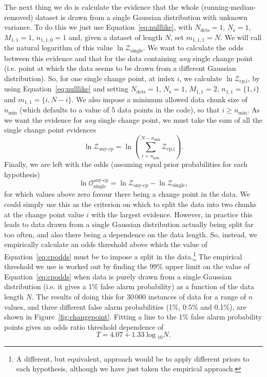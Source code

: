 The next thing we do is calculate the evidence that the whole (running-median-removed) dataset is drawn from a single
Gaussian distribution with unknown variance. To do this we just use Equation~\ref{eq:nulllike}, with $N_{\text{dets}} =1$,
$N_{\text{s}}=1$, $M_{1,1}=1$, $n_{1,1,0}=1$ and, given a dataset of length $N$, set $m_{1,1,1}=N$. We will call the natural logarithm
of this value $\ln{\mathcal{Z}_{\text{single}}}$. We want to calculate the odds between this evidence and that for the data containing
{\it any} single change point (i.e. point at which the data seems to be drawn from a different Gaussian distribution). So, for
one single change point, at index $i$, we calculate $\ln{\mathcal{Z}_{\text{cp,i}}}$, by using Equation~\ref{eq:nulllike} and setting
$N_{\text{dets}} =1$, $N_{\text{s}}=1$, $M_{1,1}=2$, $n_{1,1}=\{1,i\}$ and $m_{1,1} = \{i,N-i\}$. We also impose a minimum allowed data
chunk size of $n_{\text{min}}$ (which defaults to a value of 5 data points in the code), so that $i \geqslant n_{\text{min}}$. As we want
the evidence for {\it any} single change point, we must take the sum of all the single change point evidences
\begin{equation}
 \ln{\mathcal{Z}_{\text{any-cp}}} = \ln{\left(\sum_{i=n_{\text{min}}}^{N-n_{\text{min}}} \mathcal{Z}_{\text{cp,i}} \right)}.
\end{equation}
Finally, we are left with the odds (assuming equal prior probabilities for each hypothesis)
\begin{equation}\label{eq:cpodds}
 \ln{\mathcal{O}^{\text{any-cp}}_{\text{single}}} = \ln{\mathcal{Z}_{\text{any-cp}}} - \ln{\mathcal{Z}_{\text{single}}},
\end{equation}
for which values above zero favour there being a change point in the data. We could simply use this as the criterion on which to
split the data into two chunks at the change point value $i$ with the largest evidence. However, in practice this leads to
data drawn from a single Gaussian distribution actually being split far too often, and also there being a dependence on the
data length. So, instead, we empirically calculate an odds threshold above which the value of Equation~\ref{eq:cpodds} must be to
impose a split in the data.\footnote{A different, but equivalent, approach would be to apply different priors to each hypothesis, although we have just taken
the empirical approach.} The empirical threshold we use is worked out by finding the 99\% upper limit on the value of
Equation~\ref{eq:cpodds} when data is purely drawn from a single Gaussian distribution (i.e. it gives a 1\% false alarm probability)
as a function of the data length $N$. The results of doing this for 30\,000 instances of data for a range of $n$ values, and three
different false alarm probabilities (1\%, 0.5\% and 0.1\%), are shown in Figure~\ref{fig:changepoint}. Fitting a line to the 1\% false alarm
probability points gives an odds ratio threshold dependence of
\begin{equation}
 T = 4.07 + 1.33\log{}_{10}{N}.
\end{equation}

